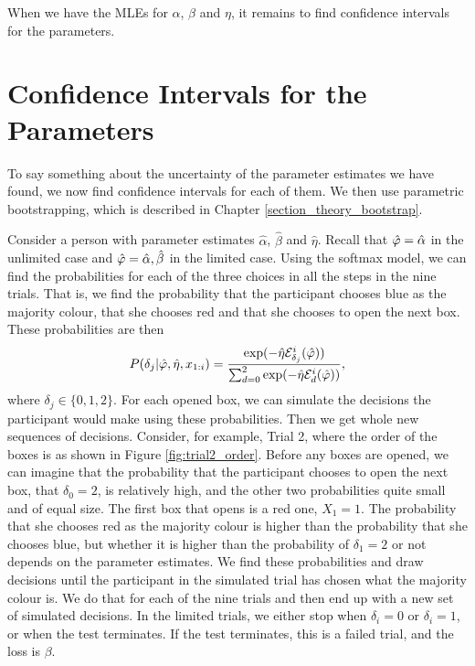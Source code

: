 When we have the MLEs for $\alpha$, $\beta$ and $\eta$, it remains to find confidence intervals for the parameters. 


\section{Confidence Intervals for the Parameters}
\label{chapter:CIs_chap3}
To say something about the uncertainty of the parameter estimates we have found, we now find confidence intervals for each of them. We then use parametric bootstrapping, which is described in Chapter \ref{section_theory_bootstrap}.

Consider a person with parameter estimates $\hat{\alpha}$, $\hat{\beta}$ and $\hat{\eta}$. Recall that $\hat{\varphi}=\hat{\alpha}$ in the unlimited case and $\hat{\varphi}=\hat{\alpha},\hat{\beta}$ in the limited case. 
Using the softmax model, we can find the probabilities for each of the three choices in all the steps in the nine trials. That is, we find the probability that the participant chooses blue as the majority colour, that she chooses red and that she chooses to open the next box. These probabilities are then
\begin{equation}
\label{probabilities_bootstrap}
    P(\delta_{j}|\hat{\varphi},\hat{\eta},x_{1:i}) = \frac{\text{exp}(- \hat{\eta} \mathcal{E}^i_{\delta_j}(\hat{\varphi}))}{\sum_{d=0}^{2} \text{exp}(-\hat{\eta} \mathcal{E}^i_{d}(\hat{\varphi}))},
\end{equation}
where $\delta_j \in \{0,1,2 \}$.
For each opened box, we can simulate the decisions the participant would make using these probabilities. Then we get whole new sequences of decisions. Consider, for example, Trial 2, where the order of the boxes is as shown in Figure \ref{fig:trial2_order}. Before any boxes are opened, we can imagine that the probability that the participant chooses to open the next box, that $\delta_0=2$, is relatively high, and the other two probabilities quite small and of equal size. The first box that opens is a red one, $X_1=1$. The probability that she chooses red as the majority colour is higher than the probability that she chooses blue, but whether it is higher than the probability of $\delta_1=2$ or not depends on the parameter estimates. We find these probabilities and draw decisions until the participant in the simulated trial has chosen what the majority colour is. We do that for each of the nine trials and then end up with a new set of simulated decisions. In the limited trials, we either stop when $\delta_i=0$ or $\delta_i=1$, or when the test terminates. If the test terminates, this is a failed trial, and the loss is $\beta$. 

